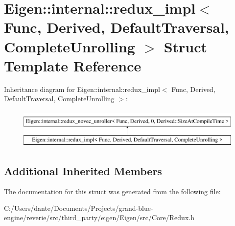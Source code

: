 \hypertarget{struct_eigen_1_1internal_1_1redux__impl_3_01_func_00_01_derived_00_01_default_traversal_00_01_complete_unrolling_01_4}{}\section{Eigen\+::internal\+::redux\+\_\+impl$<$ Func, Derived, Default\+Traversal, Complete\+Unrolling $>$ Struct Template Reference}
\label{struct_eigen_1_1internal_1_1redux__impl_3_01_func_00_01_derived_00_01_default_traversal_00_01_complete_unrolling_01_4}
Inheritance diagram for Eigen\+::internal\+::redux\+\_\+impl$<$ Func, Derived, Default\+Traversal, Complete\+Unrolling $>$\+:\begin{figure}[H]
\begin{center}
\leavevmode
\includegraphics[height=2.000000cm]{struct_eigen_1_1internal_1_1redux__impl_3_01_func_00_01_derived_00_01_default_traversal_00_01_complete_unrolling_01_4}
\end{center}
\end{figure}
\subsection*{Additional Inherited Members}


The documentation for this struct was generated from the following file\+:\begin{DoxyCompactItemize}
\item 
C\+:/\+Users/dante/\+Documents/\+Projects/grand-\/blue-\/engine/reverie/src/third\+\_\+party/eigen/\+Eigen/src/\+Core/Redux.\+h\end{DoxyCompactItemize}
